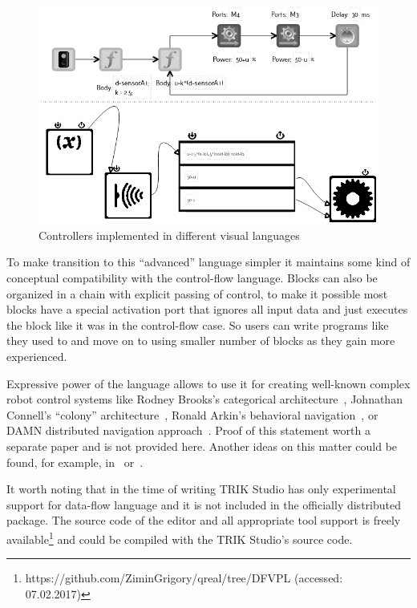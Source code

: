 \documentclass[conference]{IEEEtran}
\begin{document}
\begin{figure}[ht]
    \includegraphics[width=\columnwidth]{TS_AlongTheBox_Comparison.png}
    \caption{Controllers implemented in different visual languages}
    \label{image:alongTheBox_CF_DF}
\end{figure}

To make transition to this ``advanced'' language simpler it maintains some kind of conceptual compatibility with the control-flow language. Blocks can also be organized in a chain with explicit passing of control, to make it possible most blocks have a special activation port that ignores all input data and just executes the block like it was in the control-flow case. So users can write programs like they used to and move on to using smaller number of blocks as they gain more experienced.

Expressive power of the language allows to use it for creating well-known complex robot control systems like Rodney Brooks's categorical architecture~\cite{brooks1986robust}, Johnathan Connell's ``colony'' architecture~\cite{connell1989colony}, Ronald Arkin's behavioral navigation~\cite{arkin1987motor}, or DAMN distributed navigation approach~\cite{rosenblatt1997damn}. Proof of this statement worth a separate paper and is not provided here. Another ideas on this matter could be found, for example, in~\cite{simpson2009toward} or~\cite{banyasad2000visual}.

It worth noting that in the time of writing TRIK Studio has only experimental support for data-flow language and it is not included in the officially distributed package. The source code of the editor and all appropriate tool support is freely available\footnote{https://github.com/ZiminGrigory/qreal/tree/DFVPL (accessed: 07.02.2017)} and could be compiled with the TRIK Studio's source code.
\end{document}
